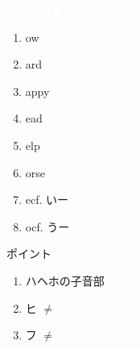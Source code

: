 \documentclass[aspectratio=169,xcolor={dvipsnames,table}]{beamer}
\begin{document}
\begin{frame}
\centering
  \textcolor{white}{\Huge\bfseries Today's Pronunciation}\pause

 \vspace{30pt}

  \textcolor{white}{\Huge\bfseries {}}


\end{frame}
\begin{frame}[plain]{}

\large

\begin{enumerate}
 \item {}ow
 \item {}ard
 \item {}appy
 \item {}ead
 \item {}elp
 \item {}orse
 \item {}e\hspace{29pt}cf. いー
 \item {}o\hspace{20pt}cf. うー
\end{enumerate}

\vspace*{10pt}

\normalsize
ポイント

\begin{enumerate}
 \item ハヘホの子音部
 \item ヒ $\neq$ 
 \item フ $\neq$ %
\hfill{\scriptsize {}}

\end{enumerate}
\end{frame}
\end{document}
